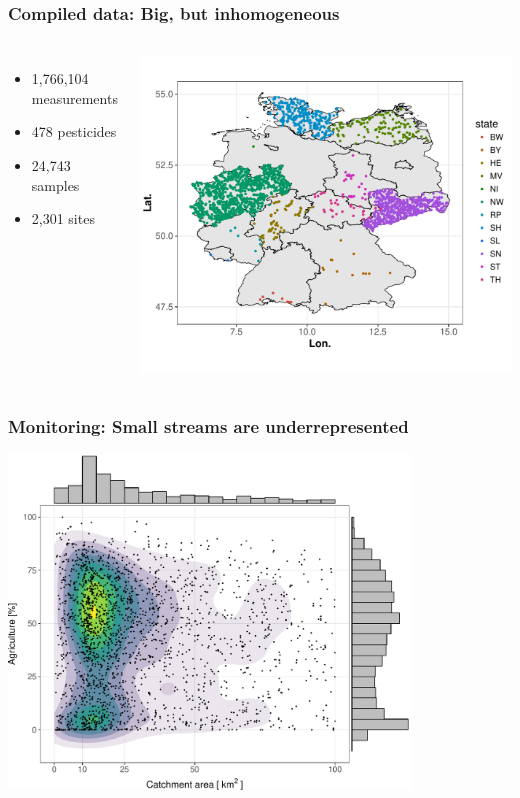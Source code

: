 \documentclass[
	10pt
	]{beamer}
\begin{document}
\begin{frame}
\frametitle{Compiled data: Big, but inhomogeneous}
	\begin{columns}
	    	\begin{itemize}
	    		\item 1,766,104 measurements 
	    		\item 478 pesticides 
	    		\item 24,743 samples 
	    		\item 2,301 sites
	    	\end{itemize}
	    	\includegraphics[width = 1.1\textwidth]{figs/map_phch.pdf}
	 \end{columns}
\end{frame}


\begin{frame}
\frametitle{Monitoring: Small streams are underrepresented}
	\includegraphics[width = 0.8\textwidth]{figs/distribution.pdf}
\end{frame}
\end{document}
